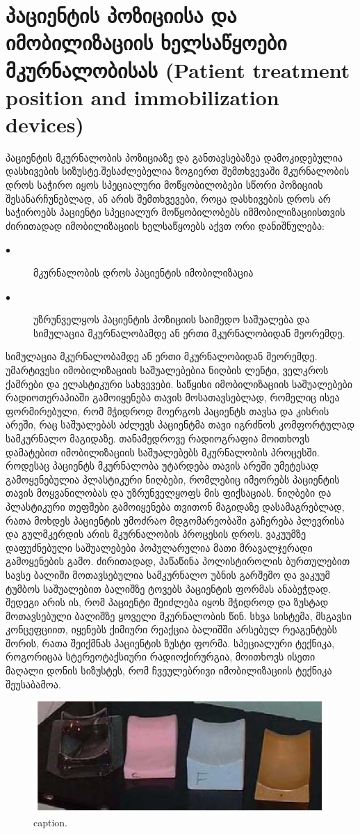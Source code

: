 \documentclass[12pt,a4paper,]{report}
\begin{document}
\chapter{პაციენტის პოზიციისა და იმობილიზაციის ხელსაწყოები მკურნალობისას (Patient treatment position and immobilization devices)}
პაციენტის მკურნალობის პოზიციაზე და განთავსებაზეა დამოკიდებულია დასხივების სიზუსტე.შესაძლებელია ზოგიერთ შემთხვევაში მკურნალობის დროს საჭირო იყოს სპეციალური მოწყობილობები სწორი პოზიციის შესანარჩუნებლად, ან არის შემთხვევები, როცა დასხივების დროს არ საჭიროებს პაციენტი სპეციალურ მოწყობილობებს იმმობილიზაციისთვის
ძირითადად იმობილიზაციის ხელსაწყოებს აქვთ ორი დანიშნულება:
	\begin{description}
      \item[$\bullet$] მკურნალობის დროს პაციენტის იმობილიზაცია
      \item[$\bullet$] უზრუნველყოს პაციენტის პოზიციის საიმედო საშუალება და სიმულაცია მკურნალობამდე ან ერთი მკურნალობიდან მეორემდე.
    \end{description}
სიმულაცია მკურნალობამდე ან ერთი მკურნალობიდან მეორემდე.
უმარტივესი იმობილიზაციის საშუალებებია ნიღბის ლენტი, ველკროს ქამრები და ელასტიკური სახვევები.  საწყისი იმობილიზაციის საშუალებები რადიოთერაპიაში გამოიყენება თავის მოსათავსებლად, რომელიც ისეა ფორმირებული, რომ მჭიდროდ მოერგოს პაციენტს თავსა და კისრის არეში, რაც საშუალებას აძლევს პაციენტმა თავი იგრძნოს კომფორტულად სამკურნალო მაგიდაზე. თანამედროვე რადიოგრაფია მოითხოვს დამატებით იმობილიზაციის საშუალებებს მკურნალობის პროცესში. როდესაც პაციენტს მკურნალობა უტარდება თავის არეში უმეტესად გამოყენებულია პლასტიკური ნიღბები, რომლებიც იმეორებს პაციენტის თავის მოყვანილობას და უზრუნველყოფს მის ფიქსაციას.
ნიღბები და პლასტიკური თეფშები გამოიყენება თვითონ მაგიდაზე დასამაგრებლად, რათა მოხდეს პაციენტის უმოძრაო მდგომარეობაში გაჩერება პლევრისა და გულმკერდის არის მკურნალობის პროცესის დროს.
ვაკუუმზე დაფუძნებული საშუალებები პოპულარულია მათი მრავალჯერადი გამოყენების გამო. ძირითადად, პაწაწინა პოლისტიროლის ბურთულებით სავსე ბალიში მოთავსებულია სამკურნალო უბნის გარშემო და ვაკუუმ ტუმბოს საშუალებით ბალიშზე ტოვებს პაციენტის ფორმას ანაბეჭდად. შედეგი არის ის, რომ პაციენტი შეიძლება იყოს მჭიდროდ და ზუსტად მოთავსებული ბალიშზე ყოველი მკურნალობის წინ.
სხვა სისტემა, მსგავსი კონცეფციით, იყენებს ქიმიური რეაქცია ბალიშში არსებულ რეაგენტებს შორის, რათა შეიქმნას პაციენტის ზუსტი ფორმა. სპეციალური ტექნიკა, როგორიცაა სტერეოტაქსიური რადიოქირურგია, მოითხოვს ისეთი მაღალი დონის სიზუსტეს, რომ ჩვეულებრივი იმობილიზაციის ტექნიკა შეუსაბამოა.
	\begin{figure}[!h]
	    \centering
        \includegraphics[width = 15cm]{images/ptpaid_01}
        \caption{caption.}
    \end{figure}
\end{document}
